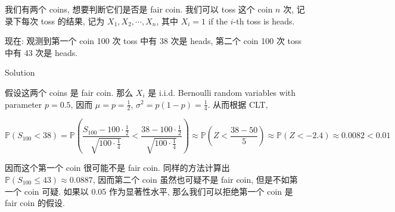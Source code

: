 \documentclass{qlnotes-export}
\begin{document}
\begin{example}

我们有两个 coins, 想要判断它们是否是 fair coin. 我们可以 toss 这个 coin \(n\) 次, 记录下每次 toss 的结果, 记为 \(X_{1},X_{2},\cdots,X_{n}\), 其中 \(X_{i} = 1\) if the \(i\)-th toss is heads.

现在: 观测到第一个 coin 100 次 toss 中有 38 次是 heads, 第二个 coin 100 次 toss 中有 43 次是 heads.

\begin{qlsolution}{Solution}

假设这两个 coins 是 fair coin. 那么 \(X_{i}\) 是 i.i.d. Bernoulli random variables with parameter \(p = 0.5\), 因而 \(\mu = p = \frac{1}{2}\), \(\sigma^{2} = p(1 - p) = \frac{1}{4}\). 从而根据 CLT,

\[{\mathbb{P}}(S_{100} < 38) = {\mathbb{P}}\left( {\frac{S_{100} - 100 \cdot \frac{1}{2}}{\sqrt{100 \cdot \frac{1}{4}}} < \frac{38 - 100 \cdot \frac{1}{2}}{\sqrt{100 \cdot \frac{1}{4}}}} \right) \approx {\mathbb{P}}\left( {Z < \frac{38 - 50}{5}} \right) \approx {\mathbb{P}}(Z < - 2.4) \approx 0.0082 < 0.01\]

因而这个第一个 coin 很可能不是 fair coin. 同样的方法计算出 \({\mathbb{P}}\left( {S_{100} \leq 43} \right) \approx 0.0887\), 因而第二个 coin 虽然也可疑不是 fair coin, 但是不如第一个 coin 可疑. 如果以 0.05 作为显著性水平, 那么我们可以拒绝第一个 coin 是 fair coin 的假设.\\

\end{qlsolution}

\end{example}
\end{document}
